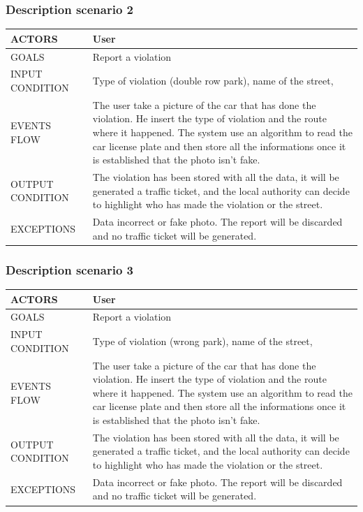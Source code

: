 \subsubsection{Description scenario 2}

\begin{center}
	\begin{tabular}{ | l | p{6cm} | } 
		\hline
		ACTORS & User  \\ 
		\hline
		GOALS & Report a violation  \\ 
		\hline
		INPUT CONDITION & Type of violation (double row park), name of the street,  \\ 
		\hline
		EVENTS FLOW & The user take a picture of the car that has done the violation. He insert the type of violation and the route where it happened. The system use an algorithm to read the car license plate and then store all the informations once it is established that the photo isn't fake.  \\ 
		\hline
		OUTPUT CONDITION & The violation has been stored with all the data, it will be generated a traffic ticket, and the local authority can decide to highlight who has made the violation or the street. \\ 
		\hline
		EXCEPTIONS & Data incorrect or fake photo. The report will be discarded and no traffic ticket will be generated.  \\ 
		\hline
	\end{tabular}
\end{center}

\subsubsection{Description scenario 3}

\begin{center}
	\begin{tabular}{ | l | p{6cm} | } 
		\hline
		ACTORS & User  \\ 
		\hline
		GOALS & Report a violation  \\ 
		\hline
		INPUT CONDITION & Type of violation (wrong park), name of the street,  \\ 
		\hline
		EVENTS FLOW & The user take a picture of the car that has done the violation. He insert the type of violation and the route where it happened. The system use an algorithm to read the car license plate and then store all the informations once it is established that the photo isn't fake.  \\ 
		\hline
		OUTPUT CONDITION & The violation has been stored with all the data, it will be generated a traffic ticket, and the local authority can decide to highlight who has made the violation or the street. \\ 
		\hline
		EXCEPTIONS & Data incorrect or fake photo. The report will be discarded and no traffic ticket will be generated.  \\ 
		\hline
	\end{tabular}
\end{center}

